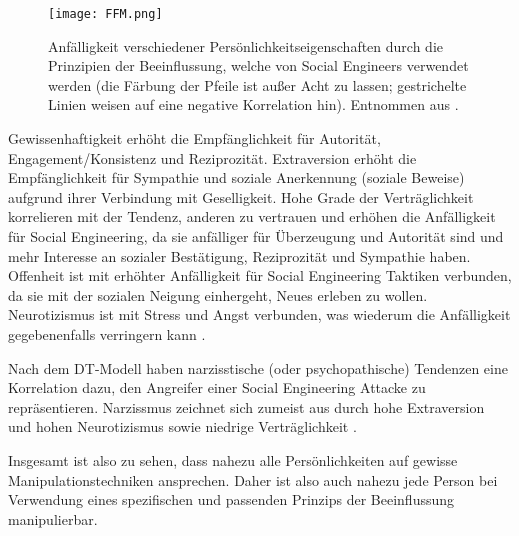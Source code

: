\begin{figure}[!htp]
    \centering
    \texttt{[image: FFM.png]}
    \caption{Anfälligkeit verschiedener Persönlichkeitseigenschaften durch die Prinzipien der Beeinflussung, welche von Social Engineers verwendet werden (die Färbung der Pfeile ist außer Acht zu lassen; gestrichelte Linien weisen auf eine negative Korrelation hin). Entnommen aus .}
\end{figure}
\FloatBarrier

Gewissenhaftigkeit erhöht die Empfänglichkeit für Autorität, Engagement/Konsistenz und Reziprozität.
Extraversion erhöht die Empfänglichkeit für Sympathie und soziale Anerkennung (soziale Beweise) aufgrund ihrer Verbindung mit Geselligkeit.
Hohe Grade der Verträglichkeit korrelieren mit der Tendenz, anderen zu vertrauen und erhöhen die Anfälligkeit für Social Engineering, da sie anfälliger für Überzeugung und Autorität sind
und mehr Interesse an sozialer Bestätigung, Reziprozität und Sympathie haben.
Offenheit ist mit erhöhter Anfälligkeit für Social Engineering Taktiken verbunden, da sie mit der sozialen Neigung einhergeht, Neues erleben zu wollen.
Neurotizismus ist mit Stress und Angst verbunden, was wiederum die Anfälligkeit gegebenenfalls verringern kann .

Nach dem DT-Modell haben narzisstische (oder psychopathische) Tendenzen eine Korrelation dazu, den Angreifer einer Social Engineering Attacke zu repräsentieren.
Narzissmus zeichnet sich zumeist aus durch hohe Extraversion und hohen Neurotizismus sowie niedrige Verträglichkeit .

Insgesamt ist also zu sehen, dass nahezu alle Persönlichkeiten auf gewisse Manipulationstechniken ansprechen.
Daher ist also auch nahezu jede Person bei Verwendung eines spezifischen und passenden Prinzips der Beeinflussung manipulierbar.
